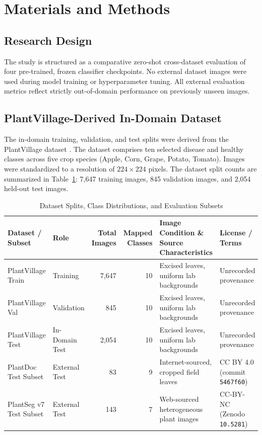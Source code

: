 \documentclass[10pt,journal,compsoc]{IEEEtran}
\begin{document}
\section{Materials and Methods}
\subsection{Research Design}
The study is structured as a comparative zero-shot cross-dataset evaluation of four pre-trained, frozen classifier checkpoints. No external dataset images were used during model training or hyperparameter tuning. All external evaluation metrics reflect strictly out-of-domain performance on previously unseen images.

\subsection{PlantVillage-Derived In-Domain Dataset}
The in-domain training, validation, and test splits were derived from the PlantVillage dataset \cite{hughes2015}. The dataset comprises ten selected disease and healthy classes across five crop species (Apple, Corn, Grape, Potato, Tomato). Images were standardized to a resolution of $224 \times 224$ pixels. The dataset split counts are summarized in Table~\ref{tab:datasets}: 7,647 training images, 845 validation images, and 2,054 held-out test images.

\begin{table}[t]
\caption{Dataset Splits, Class Distributions, and Evaluation Subsets}
\label{tab:datasets}
\centering
\begin{tabular}{llrrll}
\toprule
\textbf{Dataset / Subset} & \textbf{Role} & \textbf{Total Images} & \textbf{Mapped Classes} & \textbf{Image Condition \& Source Characteristics} & \textbf{License / Terms} \\
\midrule
PlantVillage Train & Training & 7,647 & 10 & Excised leaves, uniform lab backgrounds & Unrecorded provenance \\
PlantVillage Val & Validation & 845 & 10 & Excised leaves, uniform lab backgrounds & Unrecorded provenance \\
PlantVillage Test & In-Domain Test & 2,054 & 10 & Excised leaves, uniform lab backgrounds & Unrecorded provenance \\
PlantDoc Test Subset & External Test & 83 & 9 & Internet-sourced, cropped field leaves & CC BY 4.0 (commit \texttt{5467f60}) \\
PlantSeg v7 Test Subset & External Test & 143 & 7 & Web-sourced heterogeneous plant images & CC-BY-NC (Zenodo \texttt{10.5281}) \\
\bottomrule
\end{tabular}
\end{table}
\end{document}
